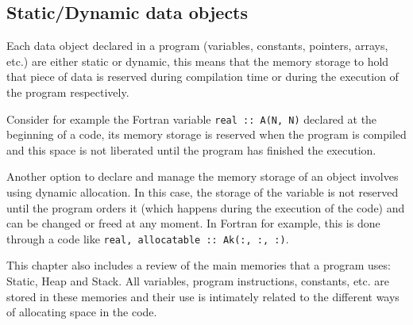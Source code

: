 


    \vspace{-.5cm}
    \subsection*{Static/Dynamic data objects}

Each data object declared in a program (variables, constants, pointers, arrays, etc.) are either static or dynamic, 
this means that the memory storage to hold that piece of data is reserved during compilation time or 
during the execution of the program respectively. 

Consider for example the Fortran variable \texttt{real :: A(N, N)} declared at the beginning of a code, 
its memory storage is reserved when the program is compiled and this space is not liberated 
until the program has finished the execution. 

Another option to declare and manage the memory storage of an object involves using dynamic allocation. 
In this case, the storage of the variable is not reserved until the program orders it (which happens during the execution of the code) and can be changed or freed at any moment. 
In Fortran for example, this is done through a code like \texttt{real, allocatable :: Ak(:, :, :)}.

This chapter also includes a review of the main memories that a program uses: Static, Heap and Stack.
All variables, program instructions, constants, etc. are stored in these memories and their use is intimately related 
to the different ways of allocating space in the code.





\newpage 
